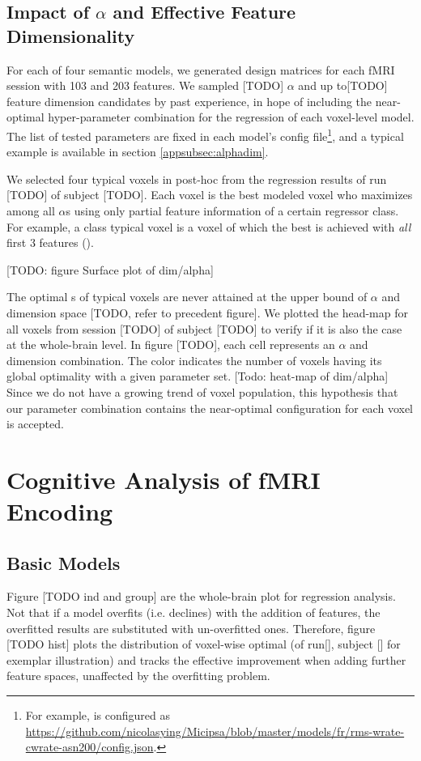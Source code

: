 \subsection{Impact of \(\alpha\) and Effective Feature Dimensionality}
For each of four semantic models, we generated design matrices for each fMRI session with 103 and 203 features. We sampled [TODO] \(\alpha\) and up to[TODO] feature dimension candidates by past experience, in hope of including the near-optimal hyper-parameter combination for the regression of each voxel-level model. The list of tested parameters are fixed in each model's config file\footnote{For example,  is configured as \url{https://github.com/nicolasying/Micipsa/blob/master/models/fr/rms-wrate-cwrate-asn200/config.json}.}, and a typical example is available in section \ref{appsubsec:alphadim}.

We selected four typical voxels in post-hoc from the regression results of run [TODO] of subject [TODO]. Each voxel is the best modeled voxel who maximizes  among all \(\alpha\)s using only partial feature information of a certain regressor class. For example, a  class typical voxel is a voxel of which the best  is achieved with \emph{all} first 3 features (). 

[TODO: figure Surface plot of dim/alpha]

The optimal s of typical voxels are never attained at the upper bound of \(\alpha\) and dimension space [TODO, refer to precedent figure]. We plotted the head-map for all voxels from session [TODO] of subject [TODO] to verify if it is also the case at the whole-brain level. In figure [TODO], each cell represents an \(\alpha\) and dimension combination. The color indicates the number of voxels having its global optimality with a given parameter set. [Todo: heat-map of dim/alpha] Since we do not have a growing trend of voxel population, this hypothesis that our parameter combination contains the near-optimal configuration for each voxel is accepted.

\section{Cognitive Analysis of fMRI Encoding}
\subsection{Basic Models}
Figure [TODO ind and group] are the whole-brain plot for regression analysis. Not that if a model overfits (i.e.  declines) with the addition of features, the overfitted results are substituted with un-overfitted ones. Therefore, figure [TODO hist] plots the distribution of voxel-wise optimal  (of run[], subject [] for exemplar illustration) and tracks the effective improvement when adding further feature spaces, unaffected by the overfitting problem. 

